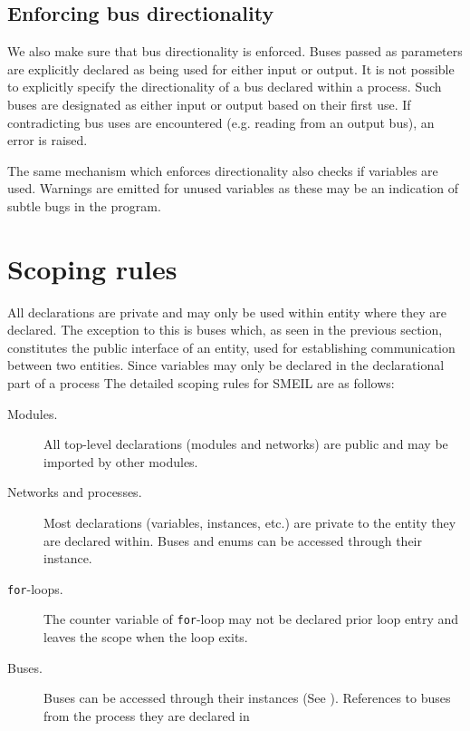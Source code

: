 
\subsection{Enforcing bus directionality}
We also make sure that bus directionality is enforced. Buses passed as
parameters are explicitly declared as being used for either input or output. It
is not possible to explicitly specify the directionality of a bus declared
within a process. Such buses are designated as either input or output based on
their first use. If contradicting bus uses are encountered (e.g. reading from an
output bus), an error is raised.

The same mechanism which enforces directionality also checks if variables are
used. Warnings are emitted for unused variables as these may be an indication of
subtle bugs in the program.

\section{Scoping rules}

All declarations are private and may only be used within entity where they are
declared. The exception to this is buses which, as seen in the previous section,
constitutes the public interface of an entity, used for establishing
communication between two entities. Since variables may only be declared in the
declarational part of a process  The detailed scoping
rules for SMEIL are as follows:

\begin{description}
  \item[Modules.] All top-level declarations (modules and networks) are public and
    may be imported by other modules.
  \item[Networks and processes.] Most declarations (variables, instances, etc.)
    are private to the entity they are declared within. Buses and enums can be
    accessed through their instance.
  \item[\texttt{for}-loops.] The counter variable of \texttt{for}-loop may not
    be declared prior loop entry and leaves the scope when the loop exits.
  \item[Buses.] Buses  can be
    accessed through their instances (See ). References to
    buses from the process they are declared in 
\end{description}


